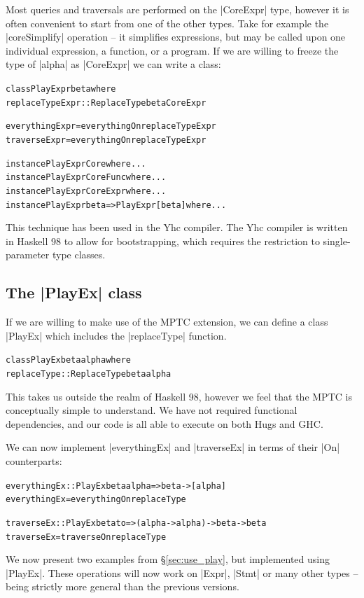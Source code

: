 \documentclass[preprint]{sigplanconf}
\newenvironment{code}{\begin{alltt}\small}{\end{alltt}}
\begin{document}
Most queries and traversals are performed on the |CoreExpr| type, however it is often convenient to start from one of the other types. Take for example the |coreSimplify| operation -- it simplifies expressions, but may be called upon one individual expression, a function, or a program. If we are willing to freeze the type of |alpha| as |CoreExpr| we can write a class:

\begin{code}
class  PlayExpr beta where
       replaceTypeExpr :: ReplaceType beta CoreExpr

everythingExpr  = everythingOn replaceTypeExpr
traverseExpr    = everythingOn replaceTypeExpr

instance PlayExpr Core where ...
instance PlayExpr CoreFunc where ...
instance PlayExpr CoreExpr where ...
instance PlayExpr beta => PlayExpr [beta] where ...
\end{code}

This technique has been used in the Yhc compiler. The Yhc compiler is written in Haskell 98 to allow for bootstrapping, which requires the restriction to single-parameter type classes.

\subsection{The |PlayEx| class}

If we are willing to make use of the MPTC extension, we can define a class |PlayEx| which includes the |replaceType| function.

\begin{code}
class  PlayEx beta alpha where
       replaceType :: ReplaceType beta alpha
\end{code}

This takes us outside the realm of Haskell 98, however we feel that the MPTC is conceptually simple to understand. We have not required functional dependencies, and our code is all able to execute on both Hugs and GHC.

We can now implement |everythingEx| and |traverseEx| in terms of their |On| counterparts:

\begin{code}
everythingEx  :: PlayEx beta alpha => beta -> [alpha]
everythingEx  = everythingOn replaceType

traverseEx    :: PlayEx beta to => (alpha -> alpha) -> beta -> beta
traverseEx    = traverseOn replaceType
\end{code}

We now present two examples from \S\ref{sec:use_play}, but implemented using |PlayEx|. These operations will now work on |Expr|, |Stmt| or many other types -- being strictly more general than the previous versions.
\end{document}
